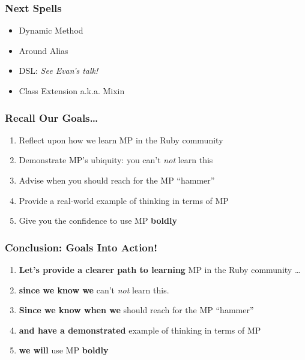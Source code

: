 \documentclass[slidestop,compress,mathserif]{beamer}
\begin{document}
\begin{frame}
	\frametitle{Next Spells}
	\begin{itemize}
		\item Dynamic Method
		\item Around Alias
		\item DSL:  \emph{See Evan's talk!}
		\item Class Extension a.k.a. Mixin
	\end{itemize}
\end{frame}

\begin{frame}
	\frametitle{Recall Our Goals\ldots}
	\begin{enumerate}
		\item Reflect upon how we learn MP in the Ruby community
		\item Demonstrate MP's ubiquity:  you can't \emph{not} learn this
		\item Advise when you should reach for the MP ``hammer''
		\item Provide a real-world example of thinking in terms of MP
		\item Give you the confidence to use MP \textbf{boldly}
	\end{enumerate}
\end{frame}

\begin{frame}
	\frametitle{Conclusion:  Goals Into Action!}
	\begin{enumerate}
		\item \textbf{Let's provide a clearer path to learning} MP in the Ruby community \ldots
		\pause
		\item \textbf{since we know we} can't \emph{not} learn this.
		\pause
		\item \textbf{Since we know when we} should reach for the MP ``hammer''
		\pause
		\item \textbf{and have a demonstrated} example of thinking in terms of MP
		\pause
		\item \textbf{we will} use MP \textbf{boldly}
	\end{enumerate}
\end{frame}


\end{document}
